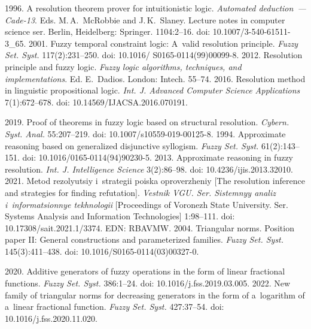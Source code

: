 \begin{multicols}{2}
{{\begin{thebibliography}{99}
 1996. A resolution theorem prover for intuitionistic logic. 
\textit{Automated deduction~--- Cade-13}. Eds. M.\,A.~McRobbie and 
J.\,K.~Slaney. Lecture notes in computer science ser. Berlin, Heidelberg: Springer. 
1104:2--16. doi: 10.1007/3-540-61511-3\_65.
 2001. Fuzzy temporal 
constraint logic: A~valid resolution principle. \textit{Fuzzy Set. Syst.} 
117(2):231--250. doi: 10.1016/ S0165-0114(99)00099-8.
 2012. Resolution principle and fuzzy logic. \textit{Fuzzy logic 
algorithms, techniques, and implementations}. Ed. E.~Dadios.  London: Intech.  
55--74.
 2016. Resolution method in linguistic 
propositional logic. \textit{Int. J. Advanced Computer Science Applications}  
7(1):672--678.  doi: 10.14569/IJACSA.2016.070191.

 2019. Proof of theorems in fuzzy logic based on structural 
resolution. \textit{Cybern. Syst. Anal.} 55:207--219. doi:  
10.1007/s10559-019-00125-8.
 1994. Approximate reasoning based on generalized 
disjunctive syllogism. \textit{Fuzzy Set. Syst.} 61(2):143--151.  
doi: 10.1016/0165-0114(94)90230-5.
 2013. Approximate reasoning in fuzzy resolution. 
\textit{Int. J. Intelligence Science} 3(2):86--98. doi: 10.4236/ijis.2013.32010.
 2021. Metod rezolyutsiy 
i~strategii poiska oproverzheniy [The resolution inference and strategies for finding 
refutation]. \textit{Vestnik VGU. Ser. Sistemnyy analiz i~informatsionnye 
tekhnologii} [Proceedings of Voronezh State University. Ser. Systems Analysis and 
Information Technologies] 1:98--111. doi: 10.17308/sait.2021.1/3374. EDN: 
RBAVMW.
 2004. Triangular norms. Position 
paper II: General constructions and parameterized families. \textit{Fuzzy Set. Syst.} 
145(3):411--438. doi: 10.1016/S0165-0114(03)00327-0.

 2020. Additive generators of fuzzy operations in the form of linear 
fractional functions. \textit{Fuzzy Set. Syst.} 386:1--24. doi: 
10.1016/j.fss.2019.03.005.
 2022. New family of triangular norms for decreasing generators in 
the form of a~logarithm of a~linear fractional function. \textit{Fuzzy Set. Syst.} 
427:37--54. doi: 10.1016/j.fss.2020.11.020.


\end{thebibliography}}}
\end{multicols}
